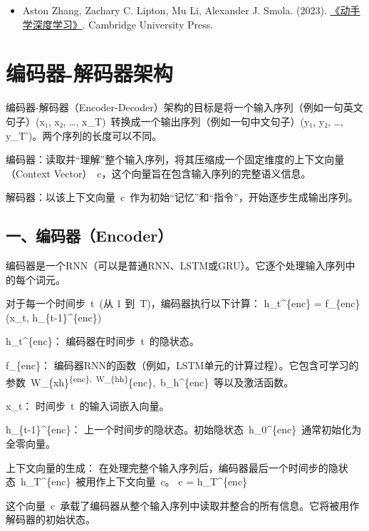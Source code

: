 \begin{itemize}
\tightlist
\item
  Aston Zhang, Zachary C. Lipton, Mu Li, Alexander J. Smola. (2023). \href{https://zh.d2l.ai/}{《动手学深度学习》}. Cambridge University Press.
\end{itemize}

\clearpage

\hypertarget{ux7f16ux7801ux5668-ux89e3ux7801ux5668ux67b6ux6784}{%
\section{编码器-解码器架构}\label{ux7f16ux7801ux5668-ux89e3ux7801ux5668ux67b6ux6784}}

编码器-解码器（Encoder-Decoder）架构的目标是将一个输入序列（例如一句英文句子）(x₁, x₂, \ldots, x\_T)~转换成一个输出序列（例如一句中文句子）(y₁, y₂, \ldots, y\_T')。两个序列的长度可以不同。

编码器：读取并``理解''整个输入序列，将其压缩成一个固定维度的上下文向量（Context Vector）~c，这个向量旨在包含输入序列的完整语义信息。

解码器：以该上下文向量~c~作为初始``记忆''和``指令''，开始逐步生成输出序列。

\hypertarget{ux4e00ux7f16ux7801ux5668encoder}{%
\subsection{一、编码器（Encoder）}\label{ux4e00ux7f16ux7801ux5668encoder}}

编码器是一个RNN（可以是普通RNN、LSTM或GRU）。它逐个处理输入序列中的每个词元。

对于每一个时间步~t~(从 1 到~T)，编码器执行以下计算：
h\_t\^{}\{enc\} = f\_\{enc\}(x\_t, h\_\{t-1\}\^{}\{enc\})

h\_t\^{}\{enc\}： 编码器在时间步~t~的隐状态。

f\_\{enc\}： 编码器RNN的函数（例如，LSTM单元的计算过程）。它包含可学习的参数~W\_\{xh\}\textsuperscript{\{enc\},~W\_\{hh\}}\{enc\},~b\_h\^{}\{enc\}~等以及激活函数。

x\_t： 时间步~t~的输入词嵌入向量。

h\_\{t-1\}\^{}\{enc\}： 上一个时间步的隐状态。初始隐状态~h\_0\^{}\{enc\}~通常初始化为全零向量。

上下文向量的生成：
在处理完整个输入序列后，编码器最后一个时间步的隐状态~h\_T\^{}\{enc\}~被用作上下文向量~c。
c = h\_T\^{}\{enc\}

这个向量~c~承载了编码器从整个输入序列中读取并整合的所有信息。它将被用作解码器的初始状态。

